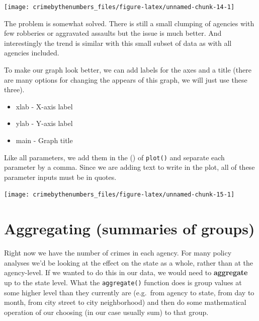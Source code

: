 \documentclass[
  12pt,
]{book}
\newenvironment{Shaded}{\begin{snugshade}}{\end{snugshade}}
\newcommand{\AttributeTok}[1]{\textcolor[rgb]{0.61,0.61,0.61}{#1}}
\newcommand{\FunctionTok}[1]{\textcolor[rgb]{0,0,0}{#1}}
\newcommand{\NormalTok}[1]{#1}
\newcommand{\SpecialCharTok}[1]{\textcolor[rgb]{0,0,0}{#1}}
\newcommand{\StringTok}[1]{\textcolor[rgb]{0.5,0.5,0.5}{#1}}
\providecommand{\tightlist}{%
  \setlength{\itemsep}{0pt}\setlength{\parskip}{0pt}}
\begin{document}
\begin{center}\texttt{[image: crimebythenumbers\_files/figure-latex/unnamed-chunk-14-1]} \end{center}

The problem is somewhat solved. There is still a small clumping of agencies with few robberies or aggravated assaults but the issue is much better. And interestingly the trend is similar with this small subset of data as with all agencies included.

To make our graph look better, we can add labels for the axes and a title (there are many options for changing the appears of this graph, we will just use these three).

\begin{itemize}
\tightlist
\item
  xlab - X-axis label
\item
  ylab - Y-axis label
\item
  main - Graph title
\end{itemize}

Like all parameters, we add them in the () of \texttt{plot()} and separate each parameter by a comma. Since we are adding text to write in the plot, all of these parameter inputs must be in quotes.

\begin{Shaded}
\end{Shaded}

\begin{center}\texttt{[image: crimebythenumbers\_files/figure-latex/unnamed-chunk-15-1]} \end{center}

\hypertarget{aggregate}{%
\section{Aggregating (summaries of groups)}\label{aggregate}}

Right now we have the number of crimes in each agency. For many policy analyses we'd be looking at the effect on the state as a whole, rather than at the agency-level. If we wanted to do this in our data, we would need to \textbf{aggregate} up to the state level. What the \texttt{aggregate()} function does is group values at some higher level than they currently are (e.g.~from agency to state, from day to month, from city street to city neighborhood) and then do some mathematical operation of our choosing (in our case usually sum) to that group.
\end{document}
